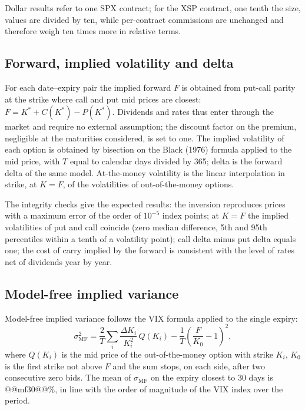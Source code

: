 \documentclass[11pt,a4paper]{article}
\begin{document}
Dollar results refer to one SPX contract; for the XSP contract, one tenth the size, values are divided by ten, while per-contract commissions are unchanged and therefore weigh ten times more in relative terms.

\subsection{Forward, implied volatility and delta}

For each date--expiry pair the implied forward $F$ is obtained from put-call parity at the strike where call and put mid prices are closest: $F = K^\ast + C(K^\ast) - P(K^\ast)$. Dividends and rates thus enter through the market and require no external assumption; the discount factor on the premium, negligible at the maturities considered, is set to one. The implied volatility of each option is obtained by bisection on the Black (1976) formula applied to the mid price, with $T$ equal to calendar days divided by 365; delta is the forward delta of the same model. At-the-money volatility is the linear interpolation in strike, at $K=F$, of the volatilities of out-of-the-money options.

The integrity checks give the expected results: the inversion reproduces prices with a maximum error of the order of $10^{-5}$ index points; at $K=F$ the implied volatilities of put and call coincide (zero median difference, 5th and 95th percentiles within a tenth of a volatility point); call delta minus put delta equals one; the cost of carry implied by the forward is consistent with the level of rates net of dividends year by year.

\subsection{Model-free implied variance}

Model-free implied variance follows the VIX formula applied to the single expiry:
\begin{equation}
\sigma^2_{\mathrm{MF}} = \frac{2}{T}\sum_i \frac{\Delta K_i}{K_i^2}\, Q(K_i) - \frac{1}{T}\left(\frac{F}{K_0}-1\right)^2 ,
\end{equation}
where $Q(K_i)$ is the mid price of the out-of-the-money option with strike $K_i$, $K_0$ is the first strike not above $F$ and the sum stops, on each side, after two consecutive zero bids. The mean of $\sigma_{\mathrm{MF}}$ on the expiry closest to 30 days is @@mf30@@\%, in line with the order of magnitude of the VIX index over the period.
\end{document}
